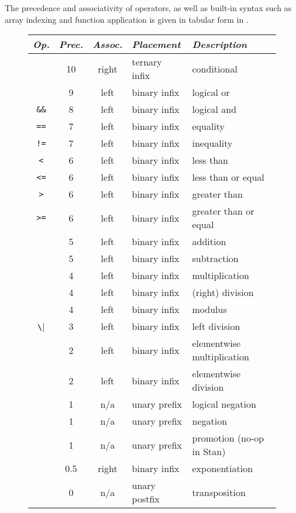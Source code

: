 The precedence and associativity of operators, as well as built-in
syntax such as array indexing and function application is given in
tabular form in .
%
\begin{figure}
\begin{center}
\begin{tabular}{c|ccl|l}
{\it Op.} & {\it Prec.} & {\it Assoc.} & {\it
  Placement} & {\it Description}
\\ \hline \hline
\code{?~:} & 10 & right & ternary infix & conditional
\\ \hline
\code{||} & 9 & left & binary infix & logical or
\\ \hline
\Verb|&&| & 8 & left & binary infix & logical and
\\ \hline
\Verb|==| & 7 & left & binary infix & equality
\\
\Verb|!=| & 7 & left & binary infix & inequality
\\ \hline
\Verb|<| & 6 & left & binary infix & less than
\\
\Verb|<=| & 6 & left & binary infix & less than or equal
\\
\Verb|>| & 6 & left & binary infix & greater than
\\
\Verb|>=| & 6 & left & binary infix & greater than or equal
\\ \hline
\code{+} & 5 & left & binary infix & addition
\\
\code{-} & 5 & left & binary infix & subtraction
\\ \hline
\code{*} & 4 & left & binary infix & multiplication
\\
\code{/} & 4 & left & binary infix & (right) division
\\
\code{\%} & 4 & left & binary infix & modulus
\\ \hline
\Verb|\| & 3 & left & binary infix & left division
\\ \hline
\code{.*} & 2 & left & binary infix & elementwise multiplication
\\
\code{./} & 2 & left & binary infix & elementwise division
\\ \hline
\code{!} & 1 & n/a & unary prefix & logical negation
\\
\code{-} & 1 & n/a & unary prefix & negation
\\
\code{+} & 1 & n/a & unary prefix & promotion (no-op in Stan)
\\ \hline
\code{\textasciicircum} & 0.5 & right & binary infix & exponentiation
\\ \hline
\code{'} & 0 & n/a & unary postfix & transposition

\end{tabular}
\end{center}
\end{figure}
